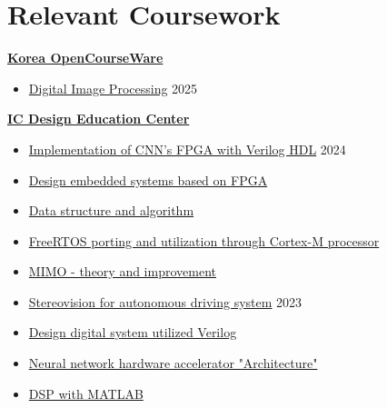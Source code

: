 \documentclass[a4paper,9pt]{extarticle}
\begin{document}
\section*{Relevant Coursework}
\noindent
\textbf{\href{https://www.kocw.net/home/index.do}{Korea OpenCourseWare}}
\begin{itemize}
    \item \href{https://github.com/user-attachments/assets/d8024d63-359a-493b-9cb2-774e36a03f62}{Digital Image Processing}                                              \hfill 2025
\end{itemize}

\noindent
\textbf{\href{https://www.idec.or.kr/main/}{IC Design Education Center}}
\begin{itemize}
    \item \href{https://github.com/user-attachments/assets/234ad610-a051-4140-9f20-48ca4d8e4d42}{Implementation of CNN's FPGA with Verilog HDL}                                          \hfill 2024
    \item \href{https://github.com/user-attachments/assets/68b0ae05-462b-4750-93ba-1bc4072dab66}{Design embedded systems based on FPGA}
    \item \href{https://github.com/user-attachments/assets/8fbda935-4b41-44f7-b83a-8d284f003168}{Data structure and algorithm}                                          
    \item \href{https://github.com/user-attachments/assets/805bbc13-3e6e-43d6-af75-df31f728d607}{FreeRTOS porting and utilization through Cortex-M processor}           
    \item \href{https://github.com/user-attachments/assets/707a4f8e-3b5a-4246-a763-81e2729f9cb2}{MIMO - theory and improvement}                                         
    \vspace{0.5em}
    \item \href{https://github.com/user-attachments/assets/2d45999d-1f66-467c-b956-e16b5ed71593}{Stereovision for autonomous driving system}                            \hfill 2023
    \item \href{https://github.com/user-attachments/assets/32bfc1d6-18cf-44a4-83dc-209b4f4686ac}{Design digital system utilized Verilog}
    \item \href{https://github.com/user-attachments/assets/094a58df-f320-45fb-aba3-707f4a7fd8f7}{Neural network hardware accelerator "Architecture"}
    \item \href{https://github.com/user-attachments/assets/9f74252d-eae5-40b2-b305-ea90576100aa}{DSP with MATLAB}

\end{itemize}
\end{document}
